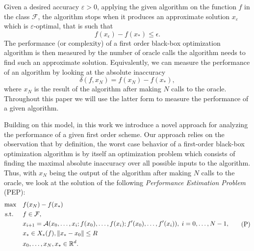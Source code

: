 \documentclass[12pt]{article}
\numberwithin{equation}{section}
\theoremstyle{definition}
\theoremstyle{remark}
\begin{document}
Given a desired accuracy $\varepsilon >0$, applying the given algorithm on the function $f$ in
the class $\mathcal{F}$, the algorithm stops when it produces an approximate solution
$x_\varepsilon$ which is $\varepsilon$-optimal, that is such that $$f(x_\epsilon) - f(x_\ast)
\leq \epsilon.$$ The performance (or complexity) of a first order black-box optimization
algorithm is then measured by the number of oracle calls  the algorithm needs to find such an
approximate solution. Equivalently, we can measure the performance of an algorithm by looking
at the absolute inaccuracy $$ \delta(f,x_N) = f(x_N) - f(x_\ast),$$ where $x_N$ is the result
of the algorithm after making $N$ calls to the oracle. Throughout this paper we will use the
latter form to measure the performance  of a given algorithm.

Building on this  model, in this work  we introduce a novel approach for analyzing the
performance of a given first order scheme. Our approach relies on the observation that by
definition, the worst case behavior of a first-order black-box optimization algorithm
 is by itself an optimization problem which consists of finding the maximal
absolute inaccuracy over all possible inputs to the algorithm.
Thus, with %
$x_N$  being the output
of the algorithm after making $N$ calls to the oracle, %
we look at the solution of the following {\em Performance Estimation Problem} (PEP):
\begin{align*}
    \begin{aligned}
    \max \quad & f(x_N)-f(x_\ast) \\
    \text{s.t. }\quad
                        & f \in \mathcal{F},\\
                        & x_{i+1}={\cal A}(x_0,\dots,x_i; f(x_0),\dots,f(x_i); f'(x_0),\dots, f'(x_i)),
                        \; i=0, \ldots, N-1,\\
                        & x_\ast \in X_\ast(f), \|x_\ast-x_0\|\leq R\\
                        & x_0, \ldots, x_N, x_\ast \in\mathbb{R}^d.
    \end{aligned}
    \tag{P}\label{P:baseproblemIntro}
\end{align*}
\end{document}
